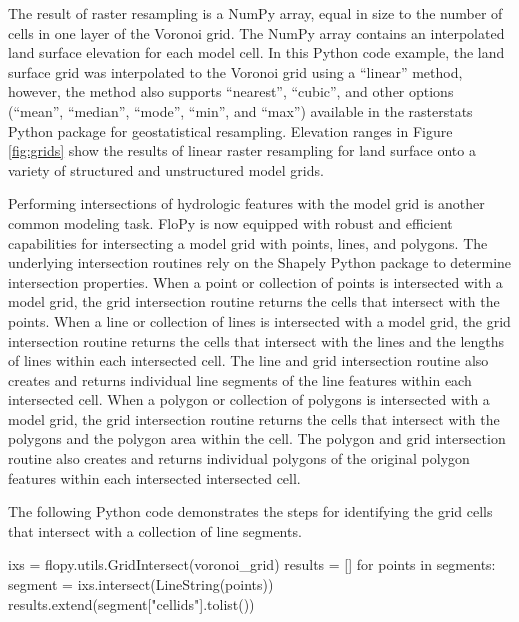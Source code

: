 \documentclass[12pt, oneside]{article}  	%
\begin{document}
\noindent The result of raster resampling is a NumPy array, equal in size to the number of cells in one layer of the Voronoi grid. The NumPy array contains an interpolated land surface elevation for each model cell. In this Python code example, the land surface grid was interpolated to the Voronoi grid using a ``linear'' method, however, the method also supports ``nearest'', ``cubic'', and other options (``mean'', ``median'', ``mode'', ``min'', and ``max'') available in the rasterstats Python package \citep{perry2013} for geostatistical resampling. Elevation ranges in Figure \ref{fig:grids} show the results of linear raster resampling for land surface onto a variety of structured and unstructured model grids.

Performing intersections of hydrologic features with the model grid is another common modeling task. FloPy is now equipped with robust and efficient capabilities for intersecting a model grid with points, lines, and polygons. The underlying intersection routines rely on the Shapely Python package \citep{shapely-gillies} to determine intersection properties. When a point or collection of points is intersected with a model grid, the grid intersection routine returns the cells that intersect with the points. When a line or collection of lines is intersected with a model grid, the grid intersection routine returns the cells that intersect with the lines and the lengths of lines within each intersected cell. The line and grid intersection routine also creates and returns individual line segments of the line features within each intersected cell. When a polygon or collection of polygons is intersected with a model grid, the grid intersection routine returns the cells that intersect with the polygons and the polygon area within the cell. The polygon and grid intersection routine also creates and returns individual polygons of the original polygon features within each intersected intersected cell.

The following Python code demonstrates the steps for identifying the grid cells that intersect with a collection of line segments.

\begin{python}
ixs = flopy.utils.GridIntersect(voronoi_grid)
results = []
for points in segments:
    segment = ixs.intersect(LineString(points))
    results.extend(segment["cellids"].tolist())
\end{python}
\end{document}
